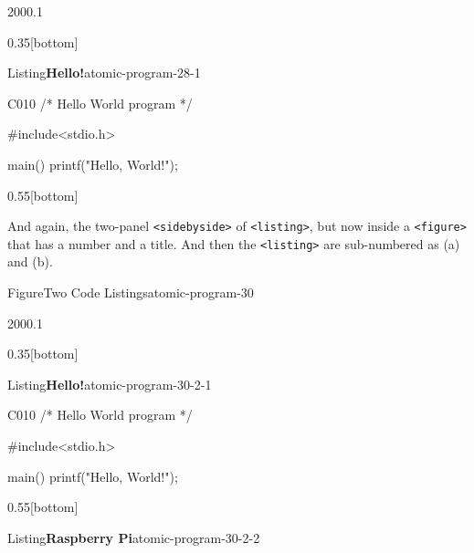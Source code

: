 \documentclass[pdflatex]{sn-jnl}
\theoremstyle{thmstyleone}%
\theoremstyle{thmstyletwo}%
\theoremstyle{thmstylethree}%
\newcommand{\mono}[1]{\texttt{#1}}
\numberwithin{equation}{section}
\newcommand{\consoleinput}[1]{\textbf{#1}}
\begin{document}
\begin{sidebyside}{2}{0}{0}{0.1}%
\begin{sbspanel}{0.35}[bottom]%
\begin{panellistingptx}{Listing}{\textbf{Hello!}}{atomic-program-28-1}{}%
\begin{program}{C}{0}{1}{0}
/* Hello World program */

#include<stdio.h>

main()
{
    printf("Hello, World!");
}
\end{program}
\tcblower
\end{panellistingptx}%
\end{sbspanel}%
\begin{sbspanel}{0.55}[bottom]%
%
\end{sbspanel}%
\end{sidebyside}%
\par
And again, the two-panel \mono{<sidebyside>} of \mono{<listing>}, but now inside a \mono{<figure>} that has a number and a title.  And then the \mono{<listing>} are sub-numbered as (a) and (b).%
\begin{figureptx}{Figure}{Two Code Listings}{atomic-program-30}{}%
\begin{sidebyside}{2}{0}{0}{0.1}%
\begin{sbspanel}{0.35}[bottom]%
\begin{sublistingptx}{Listing}{\textbf{Hello!}}{atomic-program-30-2-1}{}%
\begin{program}{C}{0}{1}{0}
/* Hello World program */

#include<stdio.h>

main()
{
    printf("Hello, World!");
}
\end{program}
\tcblower
\end{sublistingptx}%
\end{sbspanel}%
\begin{sbspanel}{0.55}[bottom]%
\begin{sublistingptx}{Listing}{\textbf{Raspberry Pi}}{atomic-program-30-2-2}{}%
\tcblower
\end{sublistingptx}%
\end{sbspanel}%
\end{sidebyside}%
\tcblower
\end{figureptx}%
%
%
\typeout{************************************************}
\typeout{Subsection 30.4 \mono{<tabular>}}
\typeout{************************************************}
%
\end{document}
